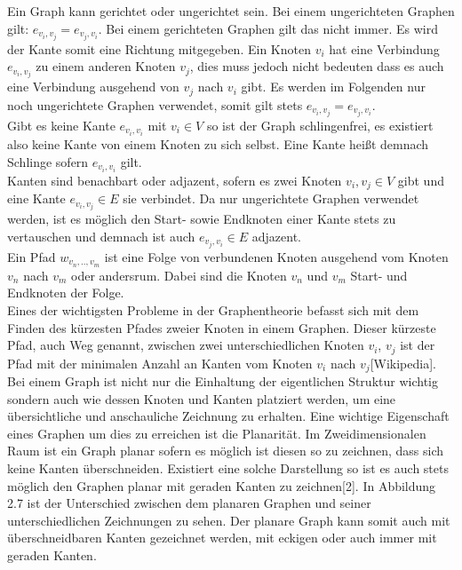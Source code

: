 Ein Graph kann gerichtet oder ungerichtet sein. Bei einem ungerichteten Graphen gilt: $e_{v_{i},v_{j}} = e_{v_{j},v_{i}}$. Bei einem gerichteten Graphen gilt das nicht immer. Es wird der Kante somit eine Richtung mitgegeben. Ein Knoten $v_{i}$ hat eine Verbindung $e_{v_{i},v_{j}}$ zu einem anderen Knoten $v_{j}$, dies muss jedoch nicht bedeuten dass es auch eine Verbindung ausgehend von $v_{j}$ nach $v_{i}$ gibt. Es werden im Folgenden nur noch ungerichtete Graphen verwendet, somit gilt stets  $e_{v_{i},v_{j}} = e_{v_{j},v_{i}}$.\\

Gibt es keine Kante $e_{v_{i},v_{i}}$ mit $v_{i} \in V$ so ist der Graph schlingenfrei, es existiert also keine Kante von einem Knoten zu sich selbst. Eine Kante heißt demnach Schlinge sofern $e_{v_{i},v_{i}}$ gilt. \\

Kanten sind benachbart oder adjazent, sofern es zwei Knoten $v_{i},v_{j} \in V$ gibt und eine Kante $e_{v_{i},v_{j}} \in E$ sie verbindet. Da nur ungerichtete Graphen verwendet werden, ist es möglich den Start- sowie Endknoten einer Kante stets zu vertauschen und demnach ist auch $e_{v_{j},v_{i}} \in E$ adjazent. \\

Ein Pfad $w_{v_{n}, .., v_{m}}$ ist eine Folge von verbundenen Knoten ausgehend vom Knoten $v_{n}$ nach $v_{m}$ oder andersrum. Dabei sind die Knoten $v_{n}$ und $v_{m}$ Start- und Endknoten der Folge.    \\

Eines der wichtigsten Probleme in der Graphentheorie befasst sich mit dem Finden des kürzesten Pfades zweier Knoten in einem Graphen. Dieser kürzeste Pfad, auch Weg genannt, zwischen zwei unterschiedlichen Knoten $v_{i}$, $v_{j}$ ist der Pfad mit der minimalen Anzahl an Kanten vom Knoten $v_{i}$ nach $v_{j}$[Wikipedia]. \\

Bei einem Graph ist nicht nur die Einhaltung der eigentlichen Struktur wichtig sondern auch wie dessen Knoten und Kanten platziert werden, um eine übersichtliche und anschauliche Zeichnung zu erhalten. Eine wichtige Eigenschaft eines Graphen um dies zu erreichen ist die Planarität. Im Zweidimensionalen Raum ist ein Graph planar sofern es möglich ist diesen so zu zeichnen, dass sich keine Kanten überschneiden. Existiert eine solche Darstellung so ist es auch stets möglich den Graphen planar mit geraden Kanten zu zeichnen[2]. In Abbildung 2.7 ist der Unterschied zwischen dem planaren Graphen und seiner unterschiedlichen Zeichnungen zu sehen. Der planare Graph kann somit auch mit überschneidbaren Kanten gezeichnet werden, mit eckigen oder auch immer mit geraden Kanten. \\


